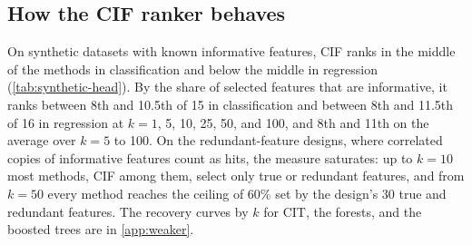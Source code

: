 \subsection{How the CIF ranker behaves}
\label{sec:boundary}

\label{sec:synthetic-recovery}%
On synthetic datasets with known informative features, CIF ranks in the middle
of the methods in classification and below the middle in regression
(\cref{tab:synthetic-head}). By the share of selected features that are
informative, it ranks between 8th and 10.5th of 15 in classification and
between 8th and 11.5th of 16 in regression at $k=1$, 5, 10, 25, 50, and 100, and 8th and 11th on the average over $k=5$ to 100. On the
redundant-feature designs, where correlated copies of informative features count
as hits, the measure saturates: up to $k=10$ most methods, CIF among them,
select only true or redundant features, and from $k=50$ every method reaches
the ceiling of 60\% set by the design's 30 true and redundant features. The
recovery curves by $k$ for CIT, the forests, and the boosted trees are in
\cref{app:weaker}.

